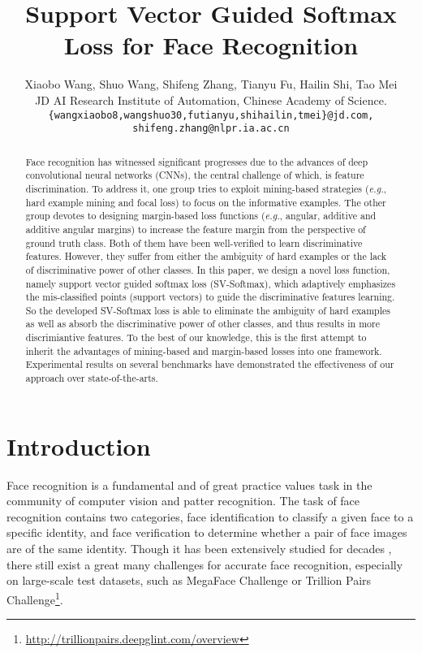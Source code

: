 \documentclass[10pt,twocolumn,letterpaper]{article}
\begin{document}
\title{Support Vector Guided Softmax Loss for Face Recognition}
\author{Xiaobo Wang, Shuo Wang, Shifeng Zhang, Tianyu Fu, Hailin Shi, Tao Mei\\
{JD AI Research
 Institute of Automation, Chinese Academy of Science. }\\
{\tt\small \{wangxiaobo8,wangshuo30,futianyu,shihailin,tmei\}@jd.com, shifeng.zhang@nlpr.ia.ac.cn}
}

\maketitle


\begin{abstract}
   Face recognition has witnessed significant progresses due to the advances of deep convolutional neural networks (CNNs), the central challenge of which, is feature discrimination. To address it, one group tries to exploit mining-based strategies (\textit{e.g.}, hard example mining and focal loss) to focus on the informative examples. The other group devotes to designing margin-based loss functions (\textit{e.g.}, angular, additive and additive angular margins) to increase the feature margin from the perspective of ground truth class. Both of them have been well-verified to learn discriminative features. However, they suffer from either the ambiguity of hard examples or the lack of discriminative power of other classes. In this paper, we design a novel loss function, namely support vector guided softmax loss (SV-Softmax), which adaptively emphasizes the mis-classified points (support vectors) to guide the discriminative features learning. So the developed SV-Softmax loss is able to eliminate the ambiguity of hard examples as well as absorb the discriminative power of other classes, and thus results in more discrimiantive features. To the best of our knowledge, this is the first attempt to inherit the advantages of mining-based and margin-based losses into one framework. Experimental results on several benchmarks have demonstrated the effectiveness of our approach over state-of-the-arts.
\end{abstract}

\section{Introduction}
Face recognition is a fundamental and of great practice values task in the community of computer vision and patter recognition. The task of face recognition contains two categories, face identification to classify a given face to a specific identity, and face verification to determine whether a pair of face images are of the same identity.
Though it has been extensively studied for decades \cite{wright2009robust,cai2014support,USSDL,DeepID,DeepID2+,shi2017cross}, there still exist a great many challenges for accurate face recognition, especially on large-scale test datasets, such as MegaFace Challenge \cite{megaface_1} or Trillion Pairs Challenge\footnote{\url{http://trillionpairs.deepglint.com/overview}}.
\end{document}
